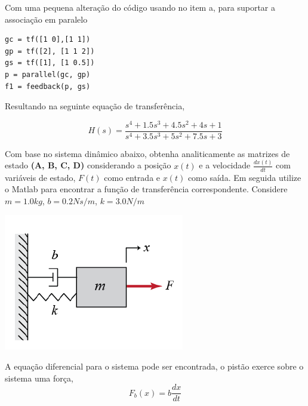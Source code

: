 \documentclass[a4paper, 10pt]{article}
\begin{document}
\begin{list}{\textbf{Questão .}}{
\setlength{\labelwidth}{-2mm} \setlength{\parsep}{0mm}
\setlength{\topsep}{0mm} \setlength{\leftmargin}{0mm}}
\begin{enumerate}
            Com uma pequena alteração do código usando no item a, para suportar
            a associação em paralelo

             \begin{lstlisting}
gc = tf([1 0],[1 1])
gp = tf([2], [1 1 2])
gs = tf([1], [1 0.5])
p = parallel(gc, gp)
f1 = feedback(p, gs)
             \end{lstlisting}

             Resultando na seguinte equação de transferência,

             $$
                H(s) = \frac{s^4 + 1.5 s^3 + 4.5 s^2 + 4 s + 1}{s^4 + 3.5 s^3 + 5 s^2 + 7.5 s + 3}
             $$


    \end{enumerate}



\newpage
\item
  Com base no sistema dinâmico abaixo, obtenha 
  analiticamente as matrizes de estado
  \textbf{(A, B, C, D)} considerando a posição $x(t)$ e a 
  velocidade $\frac{d x(t)}{dt}$ com variáveis 
  de estado, $F(t)$ como entrada e $x(t)$ como saída. Em 
  seguida utilize o Matlab para encontrar a função 
  de transferência correspondente.
  Considere $m=1.0 kg$, $b=0.2 N s/m$, $k=3.0 N/m$

            \begin{center}
            \includegraphics[scale=0.6]{fig6a.png}
            \end{center}
 

         A equação diferencial para o sistema pode ser encontrada, o pistão 
         exerce sobre o sistema uma força, 
         \begin{equation}
             F_b(x) = b \frac{d x}{d t}
         \end{equation}


\end{list}
\end{document}
